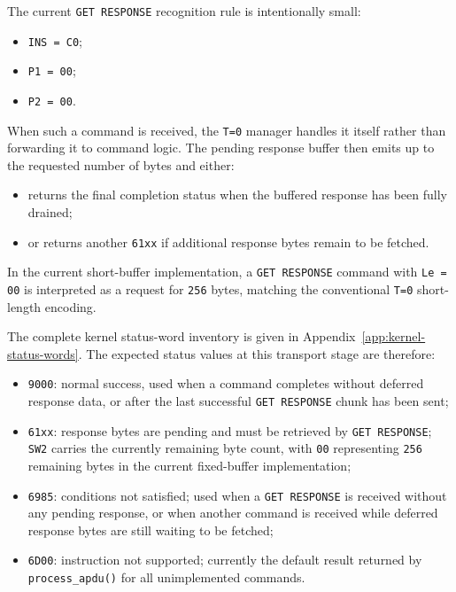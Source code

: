 The current \texttt{GET RESPONSE} recognition rule is intentionally
small:

\begin{itemize}
\item \texttt{INS = C0};
\item \texttt{P1 = 00};
\item \texttt{P2 = 00}.
\end{itemize}

When such a command is received, the \texttt{T=0} manager handles it
itself rather than forwarding it to command logic. The
pending response buffer then emits up to the requested number of bytes
and either:

\begin{itemize}
\item returns the final completion status when the buffered response has
  been fully drained;
\item or returns another \texttt{61xx} if additional response bytes
  remain to be fetched.
\end{itemize}

In the current short-buffer implementation, a \texttt{GET RESPONSE}
command with \texttt{Le = 00} is interpreted as a request for
\texttt{256} bytes, matching the conventional \texttt{T=0} short-length
encoding.

The complete kernel status-word inventory is given in
Appendix~\ref{app:kernel-status-words}. The expected status values at this
transport stage are therefore:

\begin{itemize}
\item \texttt{9000}: normal success, used when a command completes
  without deferred response data, or after the last successful
  \texttt{GET RESPONSE} chunk has been sent;
\item \texttt{61xx}: response bytes are pending and must be retrieved by
  \texttt{GET RESPONSE}; \texttt{SW2} carries the currently remaining
  byte count, with \texttt{00} representing \texttt{256} remaining
  bytes in the current fixed-buffer implementation;
\item \texttt{6985}: conditions not satisfied; used when a
  \texttt{GET RESPONSE} is received without any pending response, or
  when another command is received while deferred response bytes are
  still waiting to be fetched;
\item \texttt{6D00}: instruction not supported; currently the default
  result returned by \texttt{process\_apdu()} for all unimplemented
  commands.
\end{itemize}

